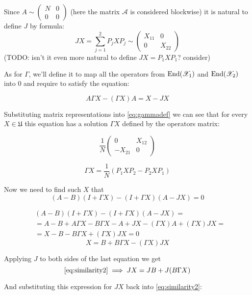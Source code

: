 \documentclass{article}
\begin{document}
Since $A \sim \begin{pmatrix} N & 0 \\ 0 & 0 \end{pmatrix}$
(here the matrix $\mathcal A$ is considered blockwise)
it is natural to define $J$ by formula:
$$JX = \sum_{j=1}^2 P_j X P_j \sim \begin{pmatrix} X_{11} & 0 \\ 0 & X_{22} \end{pmatrix}$$
(TODO: isn't it even more natural to define $JX=P_1XP_1$? consider)

As for $\Gamma$, we'll define it to map
all the operators from $\mathrm{End}({\mathscr X_1})$ and $\mathrm{End}({\mathscr X_2})$ into $0$
and require to satisfy the equation:

\begin{equation}
\label{eq:gammadef}
    A\Gamma X - (\Gamma X) A = X - JX
\end{equation}

Substituting matrix representations into \eqref{eq:gammadef} we can see
that for every $X \in \mathfrak U$ this equation has a solution $\Gamma X$
defined by the operators matrix:

$$
\frac{1}{N}
\begin{pmatrix}
    0       & X_{12} \\
    -X_{21} & 0
\end{pmatrix}
$$

$$\Gamma X = \frac{1}{N} (P_1 X P_2 - P_2 X P_1)$$

Now we need to find such $X$ that
\begin{equation}\label{eq:similarity1}
    (A - B)(I + \Gamma X) - (I + \Gamma X)(A - JX) = 0
\end{equation}

$$\begin{aligned}
    & (A - B)(I + \Gamma X) - (I + \Gamma X)(A - JX) = \\
    & = A - B + A\Gamma X - B\Gamma X - A + JX - (\Gamma X) A + (\Gamma X) JX = \\
    & = X - B - B\Gamma X + (\Gamma X) JX = 0
\end{aligned}$$
\begin{equation}\label{eq:similarity2}
    X = B + B\Gamma X - (\Gamma X) JX
\end{equation}

Applying $J$ to both sides of the last equation we get
$$\eqref{eq:similarity2} \implies
JX = JB + J(B\Gamma X)$$

And substituting this expression for $JX$ back into \eqref{eq:similarity2}:
\end{document}
